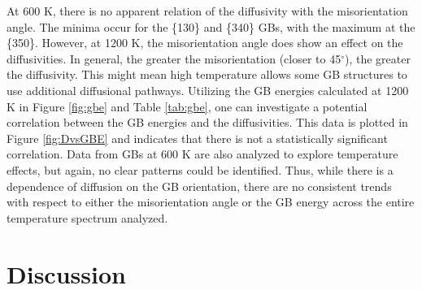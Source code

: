 \documentclass{elsarticle}
\providecommand{\DIFadd}[1]{{\protect\color{blue} \sf #1}} %
\providecommand{\DIFdel}[1]{}
\providecommand{\DIFaddbegin}{} %
\providecommand{\DIFaddend}{} %
\providecommand{\DIFdelbegin}{} %
\providecommand{\DIFdelend}{} %
\begin{document}

\DIFadd{At 600 K, there is no apparent relation of the diffusivity with the misorientation angle. The minima occur for the }\DIFaddend \{130\DIFdelbegin \DIFdel{\} GB. The symmetric tilt \{130}\DIFdelend \} \DIFdelbegin \DIFdel{GB might be a special boundary and additional simulations would likely be required to verify the exception. At high temperatures, the amount of misorientation affects both LAGBs and HAGBs. The }\DIFdelend \DIFaddbegin \DIFadd{and \{340\} GBs, with the maximum at the \{350\}. However, at 1200 K, the misorientation angle does show an effect on the diffusivities. In general, the }\DIFaddend greater the misorientation \DIFaddbegin \DIFadd{(closer to 45$^{\circ}$)}\DIFaddend , the greater the diffusivity. \DIFdelbegin \DIFdel{It is to be emphasized that misorientation }\DIFdelend \DIFaddbegin \DIFadd{This might mean high temperature allows some GB structures to use additional diffusional pathways. Utilizing the GB energies calculated at 1200 K in Figure \ref{fig:gbe} and Table \ref{tab:gbe}, one can investigate a potential correlation between the GB energies and the diffusivities. This data is plotted in Figure \ref{fig:DvsGBE} and indicates that there is not a statistically significant correlation. Data from GBs at 600 K \cite{beeler2018} are also analyzed to explore temperature effects, but again, no clear patterns could be identified. Thus, while there is a dependence of diffusion on the GB orientation, there are no consistent trends with respect to either the misorientation angle or the GB energy across the entire temperature spectrum analyzed.
}

\FloatBarrier
\section{\DIFadd{Discussion}}
\end{document}
